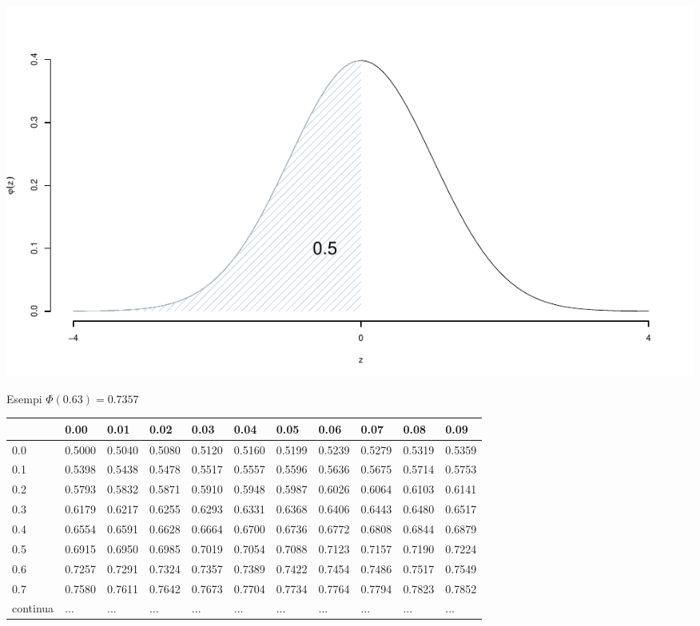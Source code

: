 \documentclass[
  11pt,
]{book}
\theoremstyle{mytheoremstyle}
\theoremstyle{mydefstyle}
\begin{document}
\begin{center}\includegraphics{Appunti_di_Statistica_2025_files/figure-latex/07c-Normale-12,-1} \end{center}

Esempi \(\Phi(0.63)=0.7357\)

\begin{tabular}{llll|>{}l|llllll}
\toprule
  & 0.00 & 0.01 & 0.02 & 0.03 & 0.04 & 0.05 & 0.06 & 0.07 & 0.08 & 0.09\\
\midrule
0.0 & 0.5000 & 0.5040 & 0.5080 & \textcolor[HTML]{AB292E}{0.5120} & 0.5160 & 0.5199 & 0.5239 & 0.5279 & 0.5319 & 0.5359\\
0.1 & 0.5398 & 0.5438 & 0.5478 & \textcolor[HTML]{AB292E}{0.5517} & 0.5557 & 0.5596 & 0.5636 & 0.5675 & 0.5714 & 0.5753\\
0.2 & 0.5793 & 0.5832 & 0.5871 & \textcolor[HTML]{AB292E}{0.5910} & 0.5948 & 0.5987 & 0.6026 & 0.6064 & 0.6103 & 0.6141\\
0.3 & 0.6179 & 0.6217 & 0.6255 & \textcolor[HTML]{AB292E}{0.6293} & 0.6331 & 0.6368 & 0.6406 & 0.6443 & 0.6480 & 0.6517\\
0.4 & 0.6554 & 0.6591 & 0.6628 & \textcolor[HTML]{AB292E}{0.6664} & 0.6700 & 0.6736 & 0.6772 & 0.6808 & 0.6844 & 0.6879\\
0.5 & 0.6915 & 0.6950 & 0.6985 & \textcolor[HTML]{AB292E}{0.7019} & 0.7054 & 0.7088 & 0.7123 & 0.7157 & 0.7190 & 0.7224\\
\midrule
\textcolor[HTML]{AB292E}{0.6} & \textcolor[HTML]{AB292E}{0.7257} & \textcolor[HTML]{AB292E}{0.7291} & \textcolor[HTML]{AB292E}{0.7324} & \textcolor[HTML]{AB292E}{0.7357} & \textcolor[HTML]{AB292E}{0.7389} & \textcolor[HTML]{AB292E}{0.7422} & \textcolor[HTML]{AB292E}{0.7454} & \textcolor[HTML]{AB292E}{0.7486} & \textcolor[HTML]{AB292E}{0.7517} & \textcolor[HTML]{AB292E}{0.7549}\\
\midrule
0.7 & 0.7580 & 0.7611 & 0.7642 & \textcolor[HTML]{AB292E}{0.7673} & 0.7704 & 0.7734 & 0.7764 & 0.7794 & 0.7823 & 0.7852\\
continua & ... & ... & ... & \textcolor[HTML]{AB292E}{...} & ... & ... & ... & ... & ... & ...\\
\bottomrule
\end{tabular}
\end{document}
